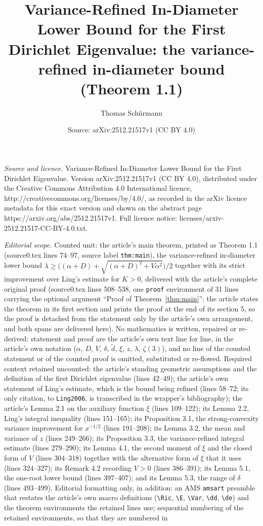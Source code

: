 \documentclass[10pt,a4paper]{amsart}
\title[Variance-Refined In-Diameter Lower Bound for the First Dirichlet Eigenvalue]{Variance-Refined In-Diameter Lower Bound for the First Dirichlet Eigenvalue: the variance-refined in-diameter bound (Theorem 1.1)}
\author{Thomas Sch\"urmann}
\date{Source: arXiv:2512.21517v1 (CC BY 4.0)}
\newcommand{\de}{\tilde d}
\theoremstyle{plain}
\theoremstyle{remark}
\begin{document}
\maketitle

\noindent\emph{Source and licence.} Variance-Refined In-Diameter Lower Bound for the First Dirichlet Eigenvalue. Version arXiv:2512.21517v1 (CC BY 4.0), distributed under the Creative Commons Attribution 4.0 International licence, http://creativecommons.org/licenses/by/4.0/, as recorded in the arXiv licence metadata for this exact version and shown on the abstract page https://arxiv.org/abs/2512.21517v1. Full licence notice: licenses/arxiv-2512.21517-CC-BY-4.0.txt.\par\smallskip

\noindent\textit{Editorial scope.} Counted unit: the article's main theorem, printed as Theorem 1.1 (source0.tex lines 74--97, source label \texttt{thm:main}), the variance-refined in-diameter lower bound $\lambda\ge\bigl((\alpha+D)+\sqrt{(\alpha+D)^2+V\alpha^2}\bigr)/2$ together with its strict improvement over Ling's estimate for $K>0$, delivered with the article's complete original proof (source0.tex lines 508--538, one \texttt{proof} environment of 31 lines carrying the optional argument ``Proof of Theorem~\ref{thm:main}''; the article states the theorem in its first section and prints the proof at the end of its section 5, so the proof is detached from the statement only by the article's own arrangement, and both spans are delivered here). No mathematics is written, repaired or re-derived: statement and proof are the article's own text line for line, in the article's own notation ($\alpha$, $D$, $V$, $\delta$, $\de$, $\xi$, $z$, $\lambda$, $\zeta(3)$), and no line of the counted statement or of the counted proof is omitted, substituted or re-flowed. Required context retained uncounted: the article's standing geometric assumptions and the definition of the first Dirichlet eigenvalue (lines 42--49); the article's own statement of Ling's estimate, which is the bound being refined (lines 58--72; its only citation, to \texttt{Ling2006}, is transcribed in the wrapper's bibliography); the article's Lemma 2.1 on the auxiliary function $\xi$ (lines 109--122); its Lemma 2.2, Ling's integral inequality (lines 151--165); its Proposition 3.1, the strong-convexity variance improvement for $x^{-1/2}$ (lines 191--208); its Lemma 3.2, the mean and variance of $z$ (lines 249--266); its Proposition 3.3, the variance-refined integral estimate (lines 279--290); its Lemma 4.1, the second moment of $\xi$ and the closed form of $V$ (lines 304--318) together with the alternative form of $\xi$ that it uses (lines 324--327); its Remark 4.2 recording $V>0$ (lines 386--391); its Lemma 5.1, the one-root lower bound (lines 397--407); and its Lemma 5.3, the range of $\delta$ (lines 493--499). Editorial formatting only, in addition: an AMS \texttt{amsart} preamble that restates the article's own macro definitions (\texttt{\textbackslash Ric}, \texttt{\textbackslash E}, \texttt{\textbackslash Var}, \texttt{\textbackslash dd}, \texttt{\textbackslash de}) and the theorem environments the retained lines use; sequential numbering of the retained environments, so that they are numbered in 
\end{document}
